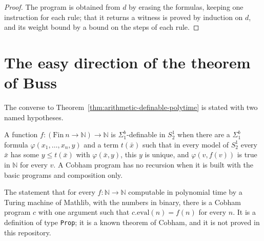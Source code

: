 \begin{proof}
  \leanok
  The program is obtained from $d$ by erasing the formulas, keeping one instruction for each rule;
  that it returns a witness is proved by induction on $d$, and its weight bound by a bound on the
  steps of each rule.
\end{proof}

\section{The easy direction of the theorem of Buss}
\label{sec:arithmetic-easy}

The converse to Theorem~\ref{thm:arithmetic-definable-polytime} is stated with two named hypotheses.

\begin{definition}
  \label{def:arithmetic-definable-n}
  \leanok
  \own{}
  \infrastructure{}
  A function $f : (\mathrm{Fin}\ n \to \mathbb{N}) \to \mathbb{N}$ is $\Sigma^b_1$-definable in
  $S^1_2$ when there are a $\Sigma^b_1$ formula $\varphi(x_1, \dots, x_n, y)$ and a term $t(\bar x)$
  such that in every model of $S^1_2$ every $\bar x$ has some $y \le t(\bar x)$ with $\varphi(\bar x,
  y)$, this $y$ is unique, and $\varphi(v, f(v))$ is true in $\mathbb{N}$ for every $v$. A Cobham
  program has no recursion when it is built with the basic programs and composition only.
\end{definition}

\begin{definition}
  \label{def:arithmetic-hyp-pol-cobham}
  \leanok
  The statement that for every $f : \mathbb{N} \to \mathbb{N}$ computable in polynomial time by a
  Turing machine of Mathlib, with the numbers in binary, there is a Cobham program $c$ with one
  argument such that $c.\mathrm{eval}(n) = f(n)$ for every $n$. It is a definition of type
  \texttt{Prop}; it is a known theorem of Cobham, and it is not proved in this repository.
\end{definition}

